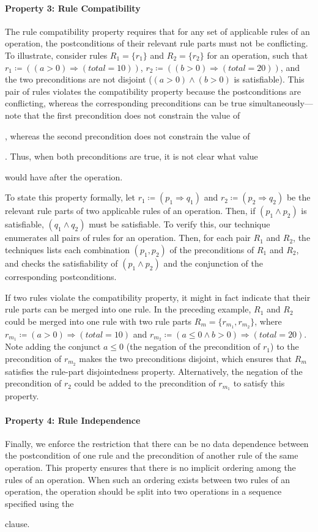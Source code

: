 \paragraph*{Property 3: Rule Compatibility}
The rule compatibility property requires that for any set of applicable rules of
an operation, the postconditions of their relevant rule parts must not be
conflicting. To illustrate, consider rules $R_1 = \{r_1\}$ and $R_2 = \{r_2\}$
for an operation, such that $r_1 \coloneqq ((a > 0) \Longrightarrow (total =
10))$, $r_2 \coloneqq ((b > 0) \Longrightarrow (total = 20))$, and the two
preconditions are not disjoint (\ie $(a > 0) \wedge (b > 0)$ is
satisfiable). This pair of rules violates the compatibility property because the
postconditions are conflicting, whereas the corresponding preconditions can be
true simultaneously---note that the first precondition does not constrain the
value of \subject{b}, whereas the second precondition does not constrain the
value of \subject{a}. Thus, when both preconditions are true, it is not clear
what value \subject{total} would have after the operation.

To state this property formally, let $r_1 \coloneqq (p_1 \Longrightarrow q_1)$
and $r_2 \coloneqq (p_2 \Longrightarrow q_2)$ be the relevant rule parts of two
applicable rules of an operation. Then, if $(p_1 \wedge p_2)$ is satisfiable,
$(q_1 \wedge q_2)$ must be satisfiable. To verify this, our technique enumerates
all pairs of rules for an operation. Then, for each pair $R_1$ and $R_2$, the
techniques lists each combination $(p_1, p_2)$ of the preconditions of $R_1$ and
$R_2$, and checks the satisfiability of $(p_1 \wedge p_2)$ and the conjunction
of the corresponding postconditions.

If two rules violate the compatibility property, it might in fact indicate that
their rule parts can be merged into one rule. In the preceding example, $R_1$
and $R_2$ could be merged into one rule with two rule parts $R_m = \{r_{m_1},
r_{m_2}\}$, where $r_{m_1} \coloneqq (a > 0) \Longrightarrow (total = 10)$ and
$r_{m_2} \coloneqq (a \leq 0 \wedge b > 0) \Longrightarrow (total = 20)$. Note
adding the conjunct $a \leq 0$ (the negation of the precondition of $r_1$) to
the precondition of $r_{m_2}$ makes the two preconditions disjoint, which
ensures that $R_m$ satisfies the rule-part disjointedness
property. Alternatively, the negation of the precondition of $r_2$ could be
added to the precondition of $r_{m_1}$ to satisfy this property.

\paragraph*{Property 4: Rule Independence}
Finally, we enforce the restriction that there can be no data dependence between
the postcondition of one rule and the precondition of another rule of the same
operation. This property ensures that there is no implicit ordering among the
rules of an operation. When such an ordering exists between two rules of an
operation, the operation should be split into two operations in a sequence
specified using the \subject{next} clause.

